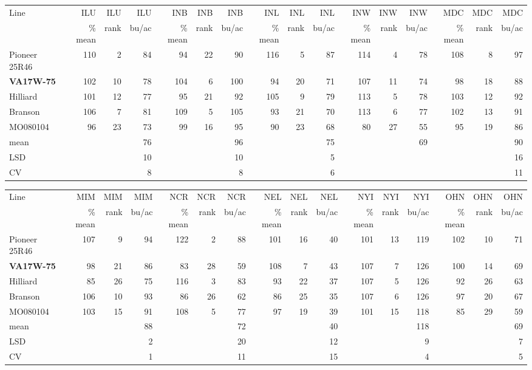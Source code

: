 \documentclass[12pt, letterpaper]{article}
\begin{document}
\begin{landscape}
\begin{table}
\begin{tabular}{|l|rrr|rrr|rrr|rrr|rrr|}
  \hline
Line & ILU & ILU & ILU & INB & INB & INB & INL & INL & INL & INW & INW & INW & MDC & MDC & MDC \\ 
 & \% mean & rank & bu/ac & \% mean & rank & bu/ac & \% mean & rank & bu/ac & \% mean & rank & bu/ac & \% mean & rank & bu/ac \\ 
  \hline
Pioneer 25R46 & 110 &   2 &  84 &  94 &  22 &  90 & 116 &   5 &  87 & 114 &   4 &  78 & 108 &   8 &  97 \\ 
  \textbf{VA17W-75} & 102 &  10 &  78 & 104 &   6 & 100 &  94 &  20 &  71 & 107 &  11 &  74 &  98 &  18 &  88 \\ 
  Hilliard & 101 &  12 &  77 &  95 &  21 &  92 & 105 &   9 &  79 & 113 &   5 &  78 & 103 &  12 &  92 \\ 
  Branson & 106 &   7 &  81 & 109 &   5 & 105 &  93 &  21 &  70 & 113 &   6 &  77 & 102 &  13 &  91 \\ 
  MO080104 &  96 &  23 &  73 &  99 &  16 &  95 &  90 &  23 &  68 &  80 &  27 &  55 &  95 &  19 &  86 \\ 
  mean &  &  &  76 &  &  &  96 &  &  &  75 &  &  &  69 &  &  &  90 \\ 
  LSD &  &  &  10 &  &  &  10 &  &  &   5 &  &  &  &  &  &  16 \\ 
  CV &  &  &   8 &  &  &   8 &  &  &   6 &  &  &  &  &  &  11 \\ 
   \hline
\end{tabular}

\bigskip

\begin{tabular}{|l|rrr|rrr|rrr|rrr|rrr|}
  \hline
Line & MIM & MIM & MIM & NCR & NCR & NCR & NEL & NEL & NEL & NYI & NYI & NYI & OHN & OHN & OHN \\ 
 & \% mean & rank & bu/ac & \% mean & rank & bu/ac & \% mean & rank & bu/ac & \% mean & rank & bu/ac & \% mean & rank & bu/ac \\ 
  \hline
Pioneer 25R46 & 107 &   9 &  94 & 122 &   2 &  88 & 101 &  16 &  40 & 101 &  13 & 119 & 102 &  10 &  71 \\ 
  \textbf{VA17W-75} &  98 &  21 &  86 &  83 &  28 &  59 & 108 &   7 &  43 & 107 &   7 & 126 & 100 &  14 &  69 \\ 
  Hilliard &  85 &  26 &  75 & 116 &   3 &  83 &  93 &  22 &  37 & 107 &   5 & 126 &  92 &  26 &  63 \\ 
  Branson & 106 &  10 &  93 &  86 &  26 &  62 &  86 &  25 &  35 & 107 &   6 & 126 &  97 &  20 &  67 \\ 
  MO080104 & 103 &  15 &  91 & 108 &   5 &  77 &  97 &  19 &  39 & 101 &  15 & 118 &  85 &  29 &  59 \\ 
  mean &  &  &  88 &  &  &  72 &  &  &  40 &  &  & 118 &  &  &  69 \\ 
  LSD &  &  &   2 &  &  &  20 &  &  &  12 &  &  &   9 &  &  &   7 \\ 
  CV &  &  &   1 &  &  &  11 &  &  &  15 &  &  &   4 &  &  &   5 \\ 
   \hline
\end{tabular}


\end{table}
\end{landscape}
\end{document}
